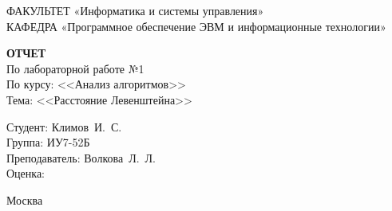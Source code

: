\begin{titlepage}
	{\doublespacing \small \raggedright ФАКУЛЬТЕТ \hspace{25mm} «Информатика и системы управления»\\
		КАФЕДРА \hspace{5mm} «Программное обеспечение ЭВМ и информационные технологии»\\}
	
	\vspace{30mm}
	
	\textbf{ОТЧЕТ}\\
	По лабораторной работе №1\\
	По курсу: <<Анализ алгоритмов>>\\
	Тема: <<Расстояние Левенштейна>>\\
	
	\vspace{60mm}
	
	\hspace{70mm} Студент:       \hfill Климов~И.~С.\\
	\hspace{70mm} Группа:        \hfill ИУ7-52Б\\
	\hspace{70mm} Преподаватель: \hfill Волкова~Л.~Л.\\
	\hspace{70mm} Оценка:        \hfill \hrulefill\\
	
	\vfill
	
	Москва\\
	\the\year
\end{titlepage}

\setcounter{page}{2}